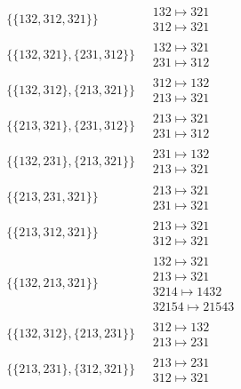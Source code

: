 \begin{scriptsize}
\begin{align}
\{\{132, 312, 321\}\}
\ 
&
\begin{matrix}
132 \mapsto 321\\312 \mapsto 321
\end{matrix}
\\
\{\{132, 321\}, \{231, 312\}\}
\ 
&
\begin{matrix}
132 \mapsto 321\\231 \mapsto 312
\end{matrix}
\\
\{\{132, 312\}, \{213, 321\}\}
\ 
&
\begin{matrix}
312 \mapsto 132\\213 \mapsto 321
\end{matrix}
\\
\{\{213, 321\}, \{231, 312\}\}
\ 
&
\begin{matrix}
213 \mapsto 321\\231 \mapsto 312
\end{matrix}
\\
\{\{132, 231\}, \{213, 321\}\}
\ 
&
\begin{matrix}
231 \mapsto 132\\213 \mapsto 321
\end{matrix}
\\
\{\{213, 231, 321\}\}
\ 
&
\begin{matrix}
213 \mapsto 321\\231 \mapsto 321
\end{matrix}
\\
\{\{213, 312, 321\}\}
\ 
&
\begin{matrix}
213 \mapsto 321\\312 \mapsto 321
\end{matrix}
\\
\{\{132, 213, 321\}\}
\ 
&
\begin{matrix}
132 \mapsto 321\\213 \mapsto 321\\3214 \mapsto 1432\\32154 \mapsto 21543
\end{matrix}
\\
\{\{132, 312\}, \{213, 231\}\}
\ 
&
\begin{matrix}
312 \mapsto 132\\213 \mapsto 231
\end{matrix}
\\
\{\{213, 231\}, \{312, 321\}\}
\ 
&
\begin{matrix}
213 \mapsto 231\\312 \mapsto 321
\end{matrix}

\end{align}
\end{scriptsize}
